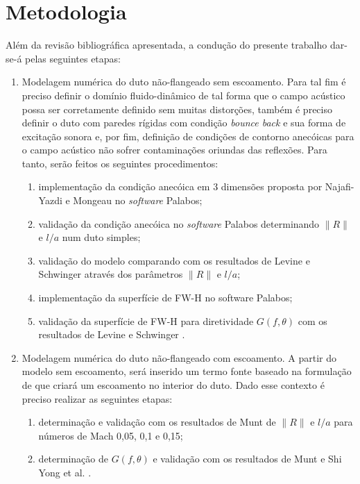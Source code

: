 \section{Metodologia}
\label{chapter:metodologia}

Além da revisão bibliográfica apresentada, a condução do presente trabalho dar-se-á pelas seguintes etapas:
\begin{enumerate}
    \item Modelagem numérica do duto não-flangeado sem escoamento. Para tal fim é preciso definir o domínio fluido-dinâmico de tal forma que o campo acústico possa ser corretamente definido sem muitas distorções, também é preciso definir o duto com paredes rígidas com condição \textit{bounce back} e sua forma de excitação sonora e, por fim, definição de condições de contorno anecóicas para o campo acústico não sofrer contaminações oriundas das reflexões. Para tanto, serão feitos os seguintes procedimentos:
        \begin{enumerate}
            \item implementação da condição anecóica em 3 dimensões proposta por Najafi-Yazdi e Mongeau \cite{najafi2012absorbing} no \textit{software} Palabos;
            \item validação da condição anecóica no \textit{software} Palabos determinando $\|R\|$ e $l/a$ num duto simples;
            \item validação do modelo comparando com os resultados de Levine e Schwinger \cite{levine1948radiation} através dos parâmetros $\|R\|$ e $l/a$;
            \item implementação da superfície de FW-H no software Palabos;
            \item validação da superfície de FW-H para diretividade $G(f,\theta)$ com os resultados de Levine e Schwinger \cite{levine1948radiation}.
        \end{enumerate}
        
    \item Modelagem numérica do duto não-flangeado com escoamento. A partir do modelo sem escoamento, será inserido um termo fonte baseado na formulação de  que criará um escoamento no interior do duto. Dado esse contexto é preciso realizar as seguintes etapas:
        \begin{enumerate}
            \item determinação e validação com os resultados de Munt \cite{munt1990acoustic} de $\|R\|$ e $l/a$ para números de Mach 0,05, 0,1 e 0,15;
            \item determinação de $G(f,\theta)$ e validação com os resultados de Munt \cite{munt1990acoustic} e Shi Yong et al. \cite{shi2013lattice}.
        \end{enumerate}
        

\end{enumerate}
